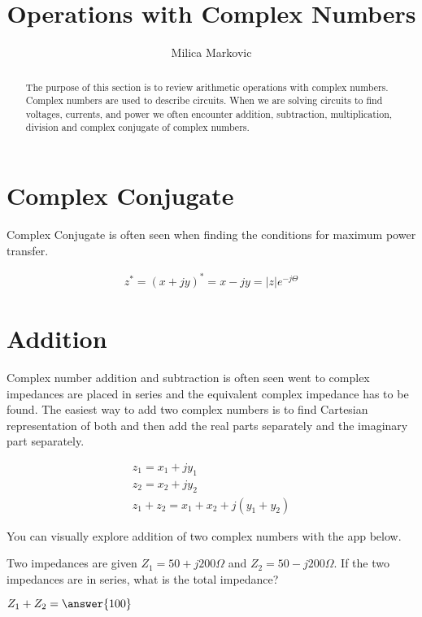 \documentclass{ximera}
\title{Operations with Complex Numbers}
\author{Milica Markovic}
\begin{document}
  
\begin{abstract}  
The purpose of this section is to review arithmetic operations with complex numbers. Complex numbers are used to describe circuits. When we are solving circuits to find voltages, currents, and power we often encounter addition, subtraction, multiplication, division and complex conjugate of complex numbers.  
\end{abstract}  
\maketitle    
  
  

\section{Complex Conjugate}

 Complex Conjugate is often seen when finding the conditions for maximum power transfer.

\begin{eqnarray}
z^* = (x+ j y)^* = x- j y = |z| e^{-j \Theta}
\end{eqnarray}


\section{Addition}



 Complex number addition and subtraction is often seen went to complex impedances are placed in series and the equivalent  complex impedance has to be found. The easiest way to add two complex numbers is to find Cartesian representation of both and then add the real parts separately and the imaginary part separately.

\begin{eqnarray}
z_1=x_1 + j y_1 \nonumber \\
z_2=x_2 + j y_2 \nonumber \\
z_1+z_2 = x_1 + x_2 + j ( y_1 + y_2)
\end{eqnarray}


You can visually explore addition of two complex numbers with the app below.
\begin{center}  
\end{center} 



\begin{question}
Two impedances are given $Z_1=50+j200 \Omega$ and  $Z_2=50-j200 \Omega$. If the two impedances are in series, what is the total impedance?
  
$Z_1+Z_2 = \answer{100}$  
\end{question} 
\end{document}
